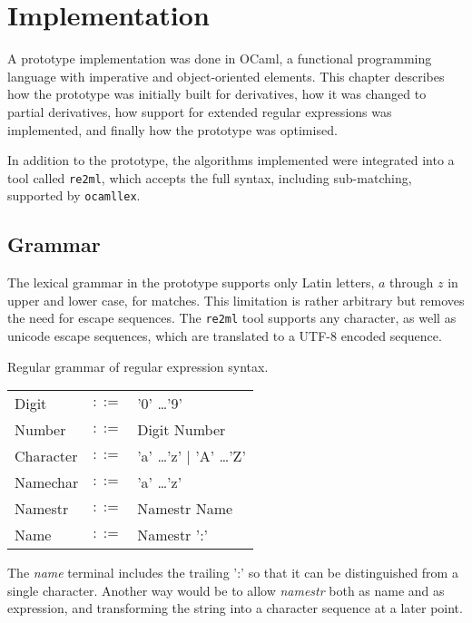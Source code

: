 \chapter{Implementation}
\label{implementation}

A prototype implementation was done in OCaml, a functional programming language
with imperative and object-oriented elements. This chapter describes how the
prototype was initially built for derivatives, how it was changed to partial
derivatives, how support for extended regular expressions was implemented, and
finally how the prototype was optimised.

In addition to the prototype, the algorithms implemented were integrated into a
tool called \texttt{re2ml}, which accepts the full syntax, including
sub-matching, supported by \texttt{ocamllex}.


\section{Grammar}

The lexical grammar in the prototype supports only Latin letters, $a$ through
$z$ in upper and lower case, for matches. This limitation is rather arbitrary
but removes the need for escape sequences. The \texttt{re2ml} tool supports any
character, as well as unicode escape sequences, which are translated to a UTF-8
encoded sequence.

\begin{defn}
   \label{defn-gram-reg}
   Regular grammar of regular expression syntax.

   \begin{tabular}{lrl}
      Digit	& $::=$	& '0' \dots '9'				\\
      Number	& $::=$	& Digit Number				\\
      Character	& $::=$	& 'a' \dots 'z' $|$ 'A' \dots 'Z'	\\
      Namechar	& $::=$	& 'a' \dots 'z'				\\
      Namestr	& $::=$	& Namestr Name				\\
      Name	& $::=$	& Namestr ':'				\\
   \end{tabular}
\end{defn}

The \textit{name} terminal includes the trailing ':' so that it can be
distinguished from a single character. Another way would be to allow
\textit{namestr} both as name and as expression, and transforming the string
into a character sequence at a later point.

